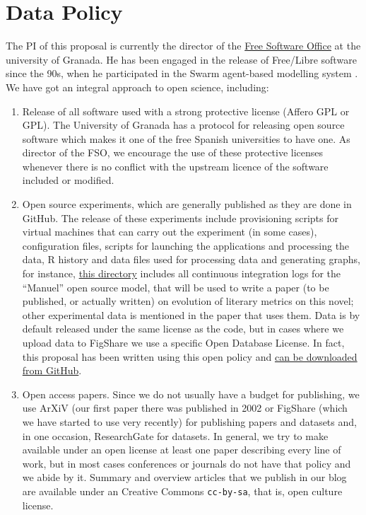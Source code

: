 \documentclass[a4paper,12pt,twocolumn]{article}
\begin{document}

\twocolumn[
  \begin{@twocolumnfalse}

\end{@twocolumnfalse}
]

\section{Data Policy}

The PI of this proposal is currently the director of the
\href{http://osl.ugr.es}{Free Software Office} at the university of
Granada. He has been engaged in the release of Free/Libre software
since the 90s, when he participated in the Swarm agent-based modelling
system \cite{breeder}. We have got an integral approach to open
science, including:
\begin{enumerate}
\item Release of all software used with a strong protective license
  (Affero GPL or GPL). The University of Granada has a protocol for
  releasing open source software which makes it one of the free
  Spanish universities to have one. As director of the FSO, we
  encourage the use of these protective licenses whenever there is no
  conflict with the upstream licence of the software included or
  modified.
\item Open source experiments, which are generally published as they
  are done in GitHub. The release of these experiments include
  provisioning scripts for virtual machines that can carry out the
  experiment (in some cases), configuration files, scripts for
  launching the applications and processing the data, R history and
  data files used for processing data and generating graphs, for
  instance, \href{https://github.com/JJ/hoborg/tree/master/data}{this
    directory} includes all continuous integration logs for the
  ``Manuel'' open source model, that will be used to write a paper (to
  be published, or actually written) on evolution of literary metrics
  on this novel; other experimental data is mentioned in the paper
  that uses them. Data is by default released under the same license
  as the code, but in cases where we upload data to FigShare we use a
  specific Open Database License. In fact, this proposal has been
  written using this open policy and
  \href{https://github.com/JJ/literatech-proposal}{can be downloaded
    from GitHub}.
\item Open access papers. Since we do not usually have a budget for
  publishing, we use ArXiV (our first paper there was published in
  2002 \cite{baldwin-AEB02} or FigShare (which we have started to use
  very recently) for publishing papers and
  datasets and, in one occasion, ResearchGate for datasets. In
  general, we try to make available under an open license at least one
  paper describing every line of work, but in most cases conferences
  or journals do not have that policy and we abide by it. Summary and
  overview articles that we publish in our blog are available under an
  Creative Commons {\tt cc-by-sa}, that is, open culture license. 
\end{enumerate}
\end{document}
